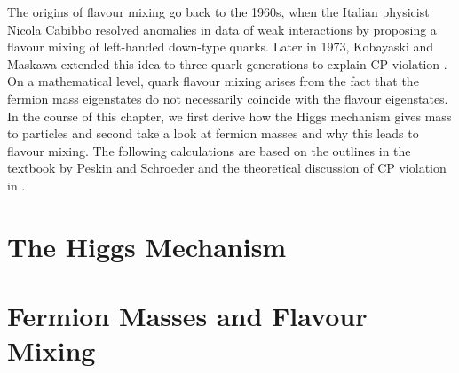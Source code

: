 The origins of flavour mixing go back to the 1960s, when the Italian physicist Nicola Cabibbo resolved anomalies in data of weak interactions by proposing a flavour mixing of left-handed down-type quarks. Later in 1973, Kobayaski and Maskawa extended this idea to three quark generations to explain CP violation \cite{Griffiths}. On a mathematical level, quark flavour mixing arises from the fact that the fermion mass eigenstates do not necessarily coincide with the flavour eigenstates. In the course of this chapter, we first derive how the Higgs mechanism gives mass to particles and second take a look at fermion masses and why this leads to flavour mixing. The following calculations are based on the outlines in the textbook by Peskin and Schroeder \cite[Chapter 20]{Peskin} and the theoretical discussion of CP violation in \mbox{\cite[Chapter 1.2.1]{Tevatron}.}
\section{The Higgs Mechanism}

\section{Fermion Masses and Flavour Mixing}
